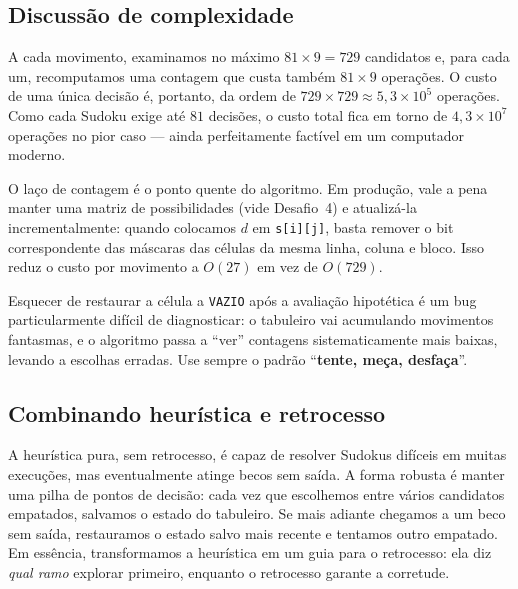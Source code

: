 \documentclass[11pt,a4paper,oneside]{report}
\newcommand{\codigo}[1]{\texttt{\color{deitelblue}#1}}
\begin{document}
\subsection{Discussão de complexidade}

A cada movimento, examinamos no máximo $81 \times 9 = 729$ candidatos e,
para cada um, recomputamos uma contagem que custa também $81 \times 9$
operações. O custo de uma única decisão é, portanto, da ordem de
$729 \times 729 \approx 5{,}3 \times 10^5$ operações. Como cada Sudoku
exige até $81$ decisões, o custo total fica em torno de $4{,}3 \times 10^7$
operações no pior caso --- ainda perfeitamente factível em um computador
moderno.

\begin{desempenho}
O laço de contagem é o ponto quente do algoritmo. Em produção, vale a
pena manter uma matriz de possibilidades (vide Desafio~4) e atualizá-la
incrementalmente: quando colocamos $d$ em \codigo{s[i][j]}, basta remover
o bit correspondente das máscaras das células da mesma linha, coluna e
bloco. Isso reduz o custo por movimento a $O(27)$ em vez de $O(729)$.
\end{desempenho}

\begin{erro}
Esquecer de restaurar a célula a \codigo{VAZIO} após a avaliação hipotética
é um bug particularmente difícil de diagnosticar: o tabuleiro vai
acumulando movimentos fantasmas, e o algoritmo passa a ``ver'' contagens
sistematicamente mais baixas, levando a escolhas erradas. Use sempre o
padrão ``\textbf{tente, meça, desfaça}''.
\end{erro}

\subsection{Combinando heurística e retrocesso}

A heurística pura, sem retrocesso, é capaz de resolver Sudokus difíceis
em muitas execuções, mas eventualmente atinge becos sem saída. A forma
robusta é manter uma pilha de pontos de decisão: cada vez que escolhemos
entre vários candidatos empatados, salvamos o estado do tabuleiro. Se
mais adiante chegamos a um beco sem saída, restauramos o estado salvo
mais recente e tentamos outro empatado. Em essência, transformamos a
heurística em um guia para o retrocesso: ela diz \emph{qual ramo} explorar
primeiro, enquanto o retrocesso garante a corretude.

\end{document}
